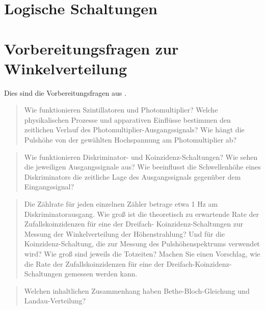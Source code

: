 \documentclass[11pt, ngerman, fleqn, DIV=15, headinclude, BCOR=2cm]{scrreprt}
\begin{document}
\section{Logische Schaltungen}

\section{Vorbereitungsfragen zur Winkelverteilung}

Dies sind die Vorbereitungsfragen aus \parencite[11]{physik512-Anleitung}.

\begin{quote}
    Wie funktionieren Szintillatoren und Photomultiplier? Welche physikalischen
    Prozesse und apparativen Einflüsse bestimmen den zeitlichen Verlauf des
    Photomultiplier-Ausgangssignals? Wie hängt die Pulshöhe von der gewählten
    Hochspannung am Photomultiplier ab?
\end{quote}


\begin{quote}
    Wie funktionieren Diskriminator- und Koinzidenz-Schaltungen? Wie sehen die
    jeweiligen Ausgangssignale aus? Wie beeinflusst die Schwellenhöhe eines
    Diskriminators die zeitliche Lage des Ausgangssignals gegenüber dem
    Eingangssignal?
\end{quote}


\begin{quote}
    Die Zählrate für jeden einzelnen Zähler betrage etwa 1 Hz am
    Diskriminatorausgang. Wie groß ist die theoretisch zu erwartende Rate der
    Zufallskoinzidenzen für eine der Dreifach- Koinzidenz-Schaltungen zur
    Messung der Winkelverteilung der Höhenstrahlung? Und für die
    Koinzidenz-Schaltung, die zur Messung des Pulshöhenspektrums verwendet
    wird? Wie groß sind jeweils die Totzeiten? Machen Sie einen Vorschlag, wie
    die Rate der Zufallskoinzidenzen für eine der
    Dreifach-Koinzidenz-Schaltungen gemessen werden kann.
\end{quote}


\begin{quote}
    Welchen inhaltlichen Zusammenhang haben Bethe-Bloch-Gleichung und
    Landau-Verteilung?
\end{quote}

\end{document}
